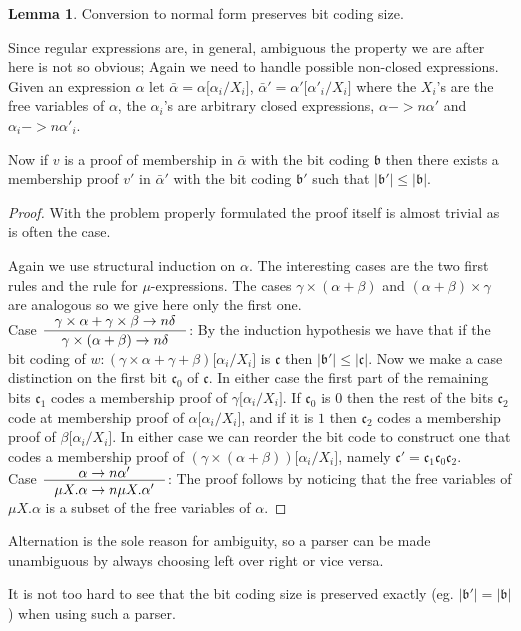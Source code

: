 \documentclass[a4paper, oneside]{memoir}
\theoremstyle{definition}
\newtheorem{lemma}{Lemma}
\begin{document}
\begin{lemma}
  Conversion to normal form preserves bit coding size.

  Since regular expressions are, in general, ambiguous the property we are after
  here is not so obvious; Again we need to handle possible non-closed
  expressions. Given an expression $\alpha$ let $\bar{\alpha} = \alpha \lbrack
  \alpha_i / X_i \rbrack$, $\bar{\alpha}' = \alpha' \lbrack \alpha'_i / X_i
  \rbrack$ where the $X_i$'s are the free variables of $\alpha$, the
  $\alpha_i$'s are arbitrary closed expressions, $\alpha ->n \alpha'$ and
  $\alpha_i ->n \alpha'_i$.

  Now if $v$ is a proof of membership in $\bar{\alpha}$ with the bit coding
  $\mathfrak{b}$ then there exists a membership proof $v'$ in $\bar{\alpha}'$
  with the bit coding $\mathfrak{b'}$ such that $| \mathfrak{b'} | \leq |
  \mathfrak{b} |$.

  \begin{proof}
    With the problem properly formulated the proof itself is almost trivial as
    is often the case.

    Again we use structural induction on $\alpha$. The interesting cases are the
    two first rules and the rule for $\mu$-expressions. The cases $\gamma \times
    (\alpha + \beta)$ and $(\alpha + \beta) \times \gamma$ are analogous so we
    give here only the first one.\\[1em]

    Case $\inference{\gamma \times \alpha + \gamma \times \beta ->n
      \delta}{\gamma \times (\alpha + \beta) ->n \delta}$: By the induction
    hypothesis we have that if the bit coding of $w : (\gamma \times \alpha +
    \gamma + \beta)\lbrack \alpha_i / X_i \rbrack$ is $\mathfrak{c}$ then $|
    \mathfrak{b'} | \leq | \mathfrak{c} |$. Now we make a case distinction on
    the first bit $\mathfrak{c_0}$ of $\mathfrak{c}$. In either case the first
    part of the remaining bits $\mathfrak{c_1}$ codes a membership proof of
    $\gamma\lbrack \alpha_i / X_i \rbrack$. If $\mathfrak{c_0}$ is $0$ then the
    rest of the bits $\mathfrak{c_2}$ code at membership proof of $\alpha\lbrack
    \alpha_i / X_i \rbrack$, and if it is $1$ then $\mathfrak{c_2}$ codes a
    membership proof of $\beta\lbrack \alpha_i / X_i \rbrack$. In either case we
    can reorder the bit code to construct one that codes a membership proof of
    $(\gamma \times (\alpha + \beta))\lbrack \alpha_i / X_i \rbrack$, namely
    $\mathfrak{c'} = \mathfrak{c_1}\mathfrak{c_0}\mathfrak{c_2}$.\\[1em]

    Case $\inference{\alpha ->n \alpha'}{\mu X. \alpha ->n \mu X. \alpha'}$: The
    proof follows by noticing that the free variables of $\mu X. \alpha$ is a
    subset of the free variables of $\alpha$.
  \end{proof}

  Alternation is the sole reason for ambiguity, so a parser can be made
  unambiguous by always choosing left over right or vice versa.

  It is not too hard to see that the bit coding size is preserved exactly
  (eg. $| \mathfrak{b'} | = | \mathfrak{b} |$) when using such a parser.
\end{lemma}
\end{document}
